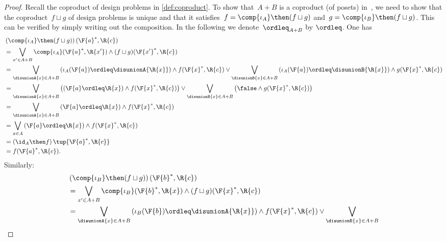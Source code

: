 \begin{proof}
    Recall the coproduct of design problems in \cref{def:coproduct}.
    To show that~$A+B$ is a coproduct (of posets) in~\DP, we need to show that the coproduct~$f \sqcup g$ of design problems is unique and that it satisfies~$f = \comp{\iota_A} \then (f \sqcup g)$ and~$g = \comp{\iota_B} \then (f \sqcup g)$.
    This can be verified by simply writing out the composition.
    In the following we denote~$\ordleq_{A+B}$ by $\ordleq$.
    One has
    \begin{equation}
        \begin{aligned}
             & \left(\comp{\iota_A}\then (f\sqcup g)\right)(\F{a}^*,\R{c})                               \\&=\bigvee_{x' \in A+B}\comp{\iota_A}(\F{a}^*,\R{x'})\wedge (f\sqcup g)(\F{x'}^*,\R{c})\\
             & =\bigvee_{\disunionA{x} \in A+B}
            \left(\iota_A(\F{a})\ordleq\disunionA{\R{x}}\right)\wedge  f(\F{x}^*,\R{c})  \vee \bigvee_{\disunionB{x} \in A+B}
            \left(\iota_A(\F{a})\ordleq \disunionB{\R{x}}\right)\wedge  g(\F{x}^*,\R{c})                 \\
             & =\bigvee_{\disunionA{x} \in A+B}
            \left( \left(\F{a}\ordleq \R{x}\right) \wedge  f(\F{x}^*,\R{c})\right) \vee \bigvee_{\disunionB{x} \in A+B}
            \left( \false \wedge  g(\F{x}^*,\R{c}) \right)                                               \\
             & =\bigvee_{\disunionA{x} \in A+B} \left(\F{a}\ordleq \R{x}\right) \wedge  f(\F{x}^*,\R{c}) \\
             & =\bigvee_{x\in A}\left( \F{a}\ordleq \R{x}\right) \wedge f(\F{x}^*,\R{c})                 \\
             & =\left( \id_A \then f\right)\tup{\F{a}^*,\R{c}}                                           \\
             & =f(\F{a}^*,\R{c}).
        \end{aligned}
    \end{equation}
    Similarly:
    \begin{equation}
        \begin{aligned}
             & \left(\comp{\iota_B}\then (f\sqcup g)\right)(\F{b}^*,\R{c})                               \\&=\bigvee_{x' \in A+B}\comp{\iota_B}(\F{b}^*,\R{x})\wedge (f\sqcup g)(\F{x}^*,\R{c})\\
             & =\bigvee_{\disunionA{x} \in A+B}
            \left(\iota_B(\F{b})\ordleq\disunionA{\R{x}}\right)\wedge  f(\F{x}^*,\R{c})  \vee \bigvee_{\disunionB{x} \in A+B}

\end{aligned}
\end{equation}
\end{proof}
